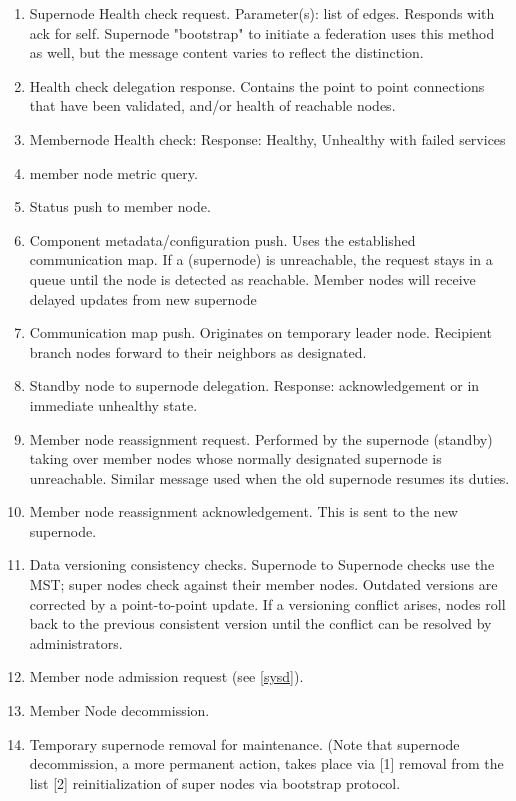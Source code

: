 \documentclass[oneside,12pt]{memoir}
\begin{document}
\begin{enumerate}
\item
Supernode Health check request.  Parameter(s): list of edges.  Responds with ack for self.  Supernode "bootstrap" to initiate a federation uses this method as well, but the message content varies to reflect the distinction. 

\item
Health check delegation response.  Contains the point to point connections that have been validated, and/or health of reachable nodes.

\item
Membernode Health check:  Response: Healthy, Unhealthy with failed services
\item
member node metric query.
\item
Status push to member node.
\item
Component metadata/configuration push.  Uses the established communication map.  If a (supernode) is unreachable, the request stays in a queue until the node is detected as reachable.  Member nodes will receive delayed updates from new supernode
\item
Communication map push.  Originates on temporary leader node.  Recipient branch nodes forward to their neighbors as designated.
\item
Standby node to supernode delegation.  Response: acknowledgement or in immediate unhealthy state.
\item
Member node reassignment request.  Performed by the supernode (standby) taking over member nodes whose normally designated supernode is unreachable.   Similar message used when the old supernode resumes its duties.
\item
Member node reassignment acknowledgement.  This is sent to the new supernode.
\item
Data versioning consistency checks.  Supernode to Supernode checks use the MST; super nodes check against their member nodes. Outdated versions are corrected by a point-to-point update.  If a versioning conflict arises, nodes roll back to the previous consistent version until the conflict can be resolved by administrators.
\item
Member node admission request (see \ref{sysd}).   
\item
Member Node decommission. 
\item 
Temporary supernode removal for maintenance.  (Note that supernode decommission, a more permanent action, takes place via [1] removal from the list [2] reinitialization of super nodes via bootstrap protocol.

\end{enumerate}
\end{document}
